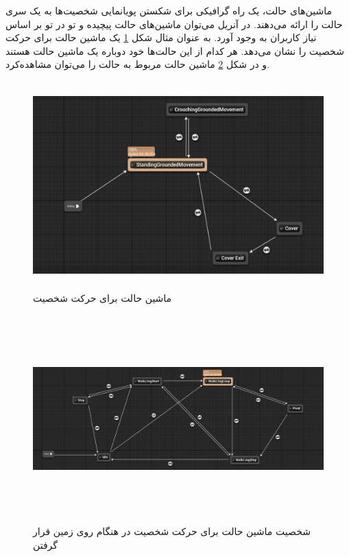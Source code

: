 ماشین‌های حالت، یک راه گرافیکی برای شکستن پویانمایی 
شخصیت‌ها به یک سری حالت را ارائه می‌دهند.
در آنریل می‌توان ماشین‌های حالت پیچیده و تو در تو بر اساس نیاز کاربران به وجود آورد.
به عنوان مثال شکل 
\ref{fig:AnimationStateMachine1}
یک ماشین حالت برای حرکت شخصیت را نشان می‌دهد.
هر کدام از این حالت‌‌ها خود دوباره یک ماشین حالت هستند 
و
در شکل 
\ref{fig:AnimationStateMachine3}
ماشین حالت مربوط به حالت 
را می‌توان مشاهده‌کرد.

\begin{figure}[ht]
	\centerline{\includegraphics[width=\textwidth,height=8cm,keepaspectratio]{Figures/Ch3/AnimationStateMachine1.png}}\hfill
	\caption{ ماشین حالت برای حرکت شخصیت }
	\label{fig:AnimationStateMachine1}
\end{figure}

\begin{figure}[ht]
	\centerline{\includegraphics[width=\textwidth,height=8cm,keepaspectratio]{Figures/Ch3/AnimationStateMachine3.png}}\hfill
	\caption{ شخصیت ماشین حالت برای حرکت شخصیت در هنگام روی زمین قرار گرفتن  }
	\label{fig:AnimationStateMachine3}
\end{figure}



